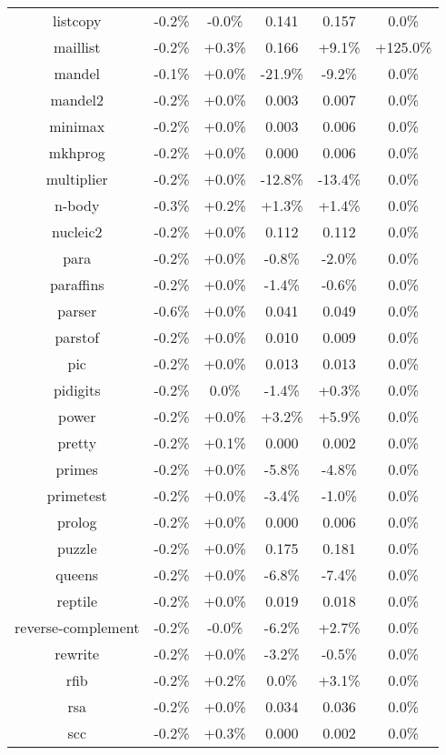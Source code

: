 \begin{tabular}{ c c c c c c }
listcopy & -0.2\% & -0.0\% & 0.141 & 0.157 &  0.0\%\\
maillist & -0.2\% & +0.3\% & 0.166 & +9.1\% & +125.0\%\\
mandel & -0.1\% & +0.0\% & -21.9\% & -9.2\% &  0.0\%\\
mandel2 & -0.2\% & +0.0\% & 0.003 & 0.007 &  0.0\%\\
minimax & -0.2\% & +0.0\% & 0.003 & 0.006 &  0.0\%\\
mkhprog & -0.2\% & +0.0\% & 0.000 & 0.006 &  0.0\%\\
multiplier & -0.2\% & +0.0\% & -12.8\% & -13.4\% &  0.0\%\\
n-body & -0.3\% & +0.2\% & +1.3\% & +1.4\% &  0.0\%\\
nucleic2 & -0.2\% & +0.0\% & 0.112 & 0.112 &  0.0\%\\
para & -0.2\% & +0.0\% & -0.8\% & -2.0\% &  0.0\%\\
paraffins & -0.2\% & +0.0\% & -1.4\% & -0.6\% &  0.0\%\\
parser & -0.6\% & +0.0\% & 0.041 & 0.049 &  0.0\%\\
parstof & -0.2\% & +0.0\% & 0.010 & 0.009 &  0.0\%\\
pic & -0.2\% & +0.0\% & 0.013 & 0.013 &  0.0\%\\
pidigits & -0.2\% &  0.0\% & -1.4\% & +0.3\% &  0.0\%\\
power & -0.2\% & +0.0\% & +3.2\% & +5.9\% &  0.0\%\\
pretty & -0.2\% & +0.1\% & 0.000 & 0.002 &  0.0\%\\
primes & -0.2\% & +0.0\% & -5.8\% & -4.8\% &  0.0\%\\
primetest & -0.2\% & +0.0\% & -3.4\% & -1.0\% &  0.0\%\\
prolog & -0.2\% & +0.0\% & 0.000 & 0.006 &  0.0\%\\
puzzle & -0.2\% & +0.0\% & 0.175 & 0.181 &  0.0\%\\
queens & -0.2\% & +0.0\% & -6.8\% & -7.4\% &  0.0\%\\
reptile & -0.2\% & +0.0\% & 0.019 & 0.018 &  0.0\%\\
reverse-complement & -0.2\% & -0.0\% & -6.2\% & +2.7\% &  0.0\%\\
rewrite & -0.2\% & +0.0\% & -3.2\% & -0.5\% &  0.0\%\\
rfib & -0.2\% & +0.2\% &  0.0\% & +3.1\% &  0.0\%\\
rsa & -0.2\% & +0.0\% & 0.034 & 0.036 &  0.0\%\\
scc & -0.2\% & +0.3\% & 0.000 & 0.002 &  0.0\%\\

\end{tabular}
